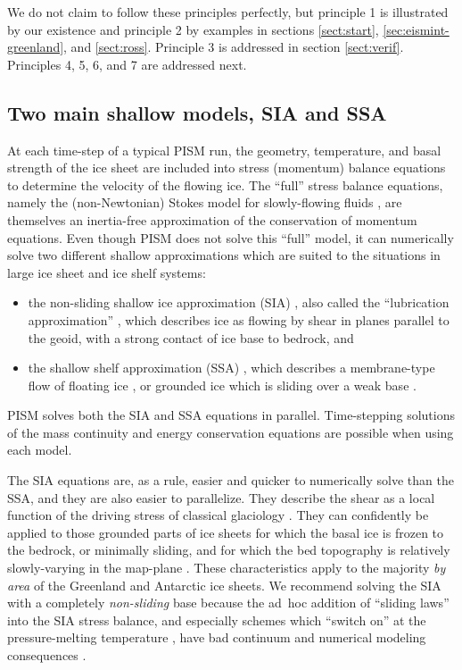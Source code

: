 \documentclass[titlepage,letterpaper,final]{scrartcl}
\begin{document}
\noindent We do not claim to follow these principles perfectly, but principle 1 is illustrated by our existence and principle 2 by examples in sections \ref{sect:start}, \ref{sec:eismint-greenland}, and \ref{sect:ross}.  Principle 3 is addressed in section \ref{sect:verif}.  Principles 4, 5, 6, and 7 are addressed next.


\subsection{Two main shallow models, SIA and SSA}  At each time-step of a typical PISM run, the geometry, temperature, and basal strength of the ice sheet are included into stress (momentum) balance equations to determine the velocity of the flowing ice.   The ``full'' stress balance equations, namely the (non-Newtonian) Stokes model for slowly-flowing fluids \cite{Fowler}, are themselves an inertia-free approximation of the conservation of momentum equations.  Even though PISM does not solve this ``full'' model, it can numerically solve two different shallow approximations which are suited to the situations in large ice sheet and ice shelf systems:
\begin{itemize}
\item the non-sliding shallow ice approximation (SIA) \cite{Hutter}, also called the ``lubrication approximation'' \cite{Fowler}, which describes ice as flowing by shear in planes parallel to the geoid, with a strong contact of ice base to bedrock, and
\item the shallow shelf approximation (SSA) \cite{WeisGreveHutter}, which describes a membrane-type flow of floating ice \cite{Morland}, or grounded ice which is sliding over a weak base \cite{MacAyeal,SchoofStream}.
\end{itemize}
PISM solves both the SIA and SSA equations in parallel.  Time-stepping solutions of the mass continuity and energy conservation equations are possible when using each model.

The SIA equations are, as a rule, easier and quicker to numerically solve than the SSA, and they are also easier to parallelize.  They describe the shear as a local function of the driving stress of classical glaciology \cite{Paterson}.  They can confidently be applied to those grounded parts of ice sheets for which the basal ice is frozen to the bedrock, or minimally sliding, and for which the bed topography is relatively slowly-varying in the map-plane \cite{Fowler}.  These characteristics apply to the majority \emph{by area} of the Greenland and Antarctic ice sheets.  We recommend solving the SIA with a completely \emph{non-sliding} base because the ad~hoc addition of ``sliding laws'' into the SIA stress balance, and especially schemes which ``switch on'' at the pressure-melting temperature \cite{EISMINT00}, have bad continuum and numerical modeling consequences \cite[appendix B]{BBssasliding}.
\end{document}
